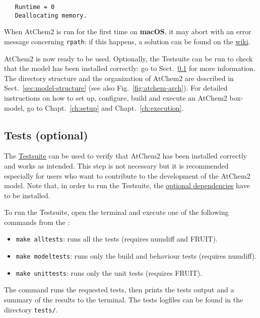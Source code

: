 \begin{enumerate}
\begin{verbatim}
   Runtime = 0
   Deallocating memory.
  \end{verbatim}
\end{enumerate}

When AtChem2 is run for the first time on \textbf{macOS}, it may abort
with an error message concerning \texttt{rpath}: if this happens,
a solution can be found on the
\href{https://github.com/AtChem/AtChem2/wiki/Known-Issues}{wiki}.

AtChem2 is now ready to be used. Optionally, the Testsuite can be run
to check that the model has been installed correctly: go to
Sect.~\ref{subsec:tests-optional} for more information. The directory
structure and the organization of AtChem2 are described in
Sect.~\ref{sec:model-structure} (see also Fig.~\ref{fig:atchem-arch}).
For detailed instructions on how to set up, configure, build and
execute an AtChem2 box-model, go to Chapt.~\ref{ch:setup} and
Chapt.~\ref{ch:execution}.

\subsection{Tests (optional)} \label{subsec:tests-optional}

The \hyperref[sec:test-suite]{Testsuite} can be used to verify that
AtChem2 has been installed correctly and works as intended. This step
is not necessary but it is recommended especially for users who want
to contribute to the development of the AtChem2 model.
Note that, in order to run the Testsuite, the
\hyperref[subsec:optional-dependencies]{optional dependencies} have to
be installed.

To run the Testsuite, open the terminal and execute one of the
following commands from the \maindir:

\begin{itemize}
\item \verb|make alltests|: runs all the tests (requires numdiff and
  FRUIT).
\item \verb|make modeltests|: runs only the build and behaviour tests
  (requires numdiff).
\item \verb|make unittests|: runs only the unit tests (requires
  FRUIT).
\end{itemize}

The command runs the requested tests, then prints the tests output and
a summary of the results to the terminal. The tests logfiles can be
found in the directory \texttt{tests/}.

